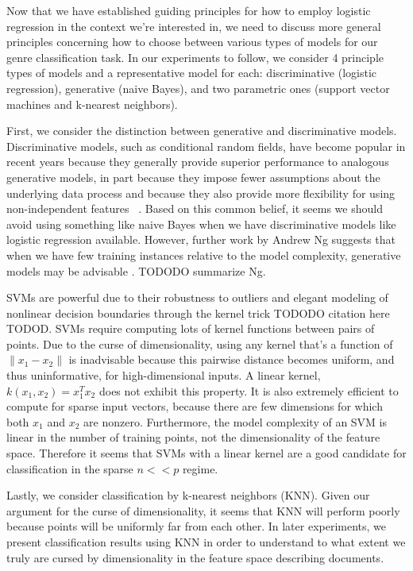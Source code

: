 \documentclass[]{article}
\begin{document}
	Now that we have established guiding principles for how to employ logistic regression in the context we're interested in, we need to discuss more general principles concerning how to choose between various types of models for our genre classification task. In our experiments to follow, we consider 4 principle types of models and a representative model for each: discriminative (logistic regression), generative (naive Bayes), and two parametric ones (support vector machines and k-nearest neighbors). 

	First, we consider the distinction between generative and discriminative models. Discriminative models, such as conditional random fields, have become popular in recent years because they generally provide superior performance to analogous generative models, in part because they impose fewer assumptions about the underlying data process and because they also provide more flexibility for using non-independent features ~\cite{lafferty2001conditional}. Based on this common belief, it seems we should avoid using something like naive Bayes when we have discriminative models like logistic regression available. However, further work by Andrew Ng suggests that when we have few training instances relative to the model complexity, generative models may be advisable \cite{jordan2002discriminative}. TODODO summarize Ng.
	
	SVMs are powerful due to their robustness to outliers and elegant modeling of nonlinear decision boundaries through the kernel trick TODODO citation here TODOD. SVMs require computing lots of kernel functions between pairs of points. Due to the curse of dimensionality, using any kernel that's a function of $\lVert x_1 - x_2 \rVert$ is inadvisable because this pairwise distance becomes uniform, and thus uninformative, for high-dimensional inputs. A linear kernel, $k(x_1,x_2) = x_1^Tx_2$ does not exhibit this property. It is also extremely efficient to compute for sparse input vectors, because there are few dimensions for which both $x_1$ and $x_2$ are nonzero. Furthermore, the model complexity of an SVM is linear in the number of training points, not the dimensionality of the feature space. Therefore it seems that SVMs with a linear kernel are a good candidate for classification in the sparse $n << p$ regime. 

	Lastly, we consider classification by k-nearest neighbors (KNN). Given our argument for the curse of dimensionality, it seems that KNN will perform poorly because points will be uniformly far from each other. In later experiments, we present classification results using KNN in order to understand to what extent we truly are cursed by dimensionality in the feature space describing documents. 
\end{document}
